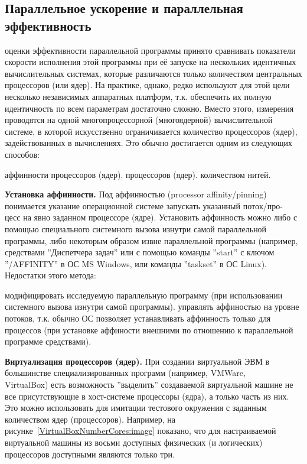 { %
	\subsection{Параллельное ускорение и параллельная эффективность}
	 оценки эффективности параллельной программы принято сравнивать показатели скорости исполнения этой программы при её запуске на нескольких идентичных вычислительных системах, которые различаются только количеством центральных процессоров (или ядер). На практике, однако, редко используют для этой цели несколько независимых аппаратных платформ, т.к. обеспечить их полную идентичность по всем параметрам достаточно сложно. Вместо этого, измерения проводятся на одной многопроцессорной (многоядерной) вычислительной системе, в которой искусственно ограничивается количество процессоров (ядер), задействованных в вычислениях. Это обычно достигается одним из следующих способов:
	\begin{itemize}
		 аффинности процессоров (ядер).
		 процессоров (ядер).
		 количеством нитей.
	\end{itemize}
	\textbf{Установка аффинности.} Под аффинностью (processor affinity/pinning) понимается указание операционной системе запускать указанный поток/про-\\цесс на явно заданном процессоре (ядре). Установить аффинность можно либо с помощью специального системного вызова изнутри самой параллельной программы, либо некоторым образом извне параллельной программы (например, средствами ''Диспетчера задач'' или с помощью команды ''start'' с ключом ''/AFFINITY'' в ОС MS Windows, или команды ''taskset'' в ОС Linux). Недостатки этого метода:
	\begin{itemize}
		 модифицировать исследуемую параллельную программу (при использовании системного вызова изнутри самой программы).
		 управлять аффиностью на уровне потоков, т.к. обычно ОС позволяет устанавливать аффинность только для процессов (при установке аффиности внешними по отношению к параллельной программе средствами).
	\end{itemize}
	\textbf{Виртуализация процессоров (ядер).} При создании виртуальной ЭВМ в большинстве специализированных программ (например, VMWare, \\VirtualBox) есть возможность ''выделить'' создаваемой виртуальной машине не все присутствующие в хост-системе процессоры (ядра), а только часть из них. Это можно использовать для имитации тестового окружения с заданным количеством ядер (процессоров). Например, на рисунке~\ref{VirtualBoxNumberCores:image} показано, что для настраиваемой виртуальной машины из восьми доступных физических (и логических) процессоров доступными являются только три.
}
